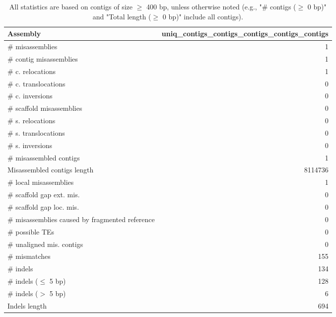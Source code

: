 \documentclass[12pt,a4paper]{article}
\begin{document}
\begin{table}[ht]
\begin{center}
\caption{All statistics are based on contigs of size $\geq$ 400 bp, unless otherwise noted (e.g., "\# contigs ($\geq$ 0 bp)" and "Total length ($\geq$ 0 bp)" include all contigs).}
\begin{tabular}{|l*{1}{|r}|}
\hline
Assembly & uniq\_contigs\_contigs\_contigs\_contigs\_contigs \\ \hline
\# misassemblies & 1 \\ \hline
\hspace{2mm}\# contig misassemblies & 1 \\ \hline
\hspace{5mm}\# c. relocations & 1 \\ \hline
\hspace{5mm}\# c. translocations & 0 \\ \hline
\hspace{5mm}\# c. inversions & 0 \\ \hline
\hspace{2mm}\# scaffold misassemblies & 0 \\ \hline
\hspace{5mm}\# s. relocations & 0 \\ \hline
\hspace{5mm}\# s. translocations & 0 \\ \hline
\hspace{5mm}\# s. inversions & 0 \\ \hline
\# misassembled contigs & 1 \\ \hline
Misassembled contigs length & 8114736 \\ \hline
\# local misassemblies & 1 \\ \hline
\# scaffold gap ext. mis. & 0 \\ \hline
\# scaffold gap loc. mis. & 0 \\ \hline
\# misassemblies caused by fragmented reference & 0 \\ \hline
\# possible TEs & 0 \\ \hline
\# unaligned mis. contigs & 0 \\ \hline
\# mismatches & 155 \\ \hline
\# indels & 134 \\ \hline
\hspace{5mm}\# indels ($\leq$ 5 bp) & 128 \\ \hline
\hspace{5mm}\# indels ($>$ 5 bp) & 6 \\ \hline
Indels length & 694 \\ \hline
\end{tabular}
\end{center}
\end{table}
\end{document}
